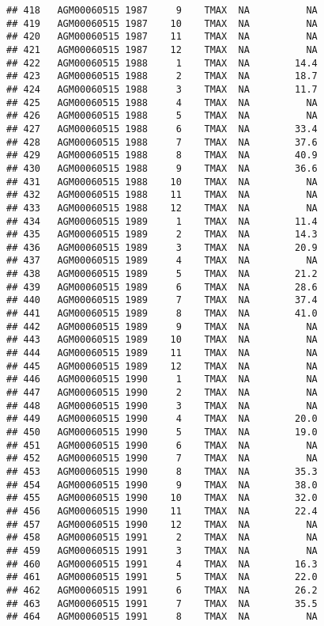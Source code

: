 \documentclass{article}\usepackage[]{graphicx}\usepackage[]{color}
\makeatletter
\newenvironment{kframe}{%
 \def\at@end@of@kframe{}%
 \ifinner\ifhmode%
  \def\at@end@of@kframe{\end{minipage}}%
  \begin{minipage}{\columnwidth}%
 \fi\fi%
 \def\FrameCommand##1{\hskip\@totalleftmargin \hskip-\fboxsep
 \colorbox{shadecolor}{##1}\hskip-\fboxsep
     \hskip-\linewidth \hskip-\@totalleftmargin \hskip\columnwidth}%
 \MakeFramed {\advance\hsize-\width
   \@totalleftmargin\z@ \linewidth\hsize
   \@setminipage}}%
 {\par\unskip\endMakeFramed%
 \at@end@of@kframe}
\newenvironment{knitrout}{}{} %
\makeatother
\begin{document}
\begin{knitrout}
\begin{kframe}
\begin{verbatim}
## 418   AGM00060515 1987     9    TMAX  NA          NA
## 419   AGM00060515 1987    10    TMAX  NA          NA
## 420   AGM00060515 1987    11    TMAX  NA          NA
## 421   AGM00060515 1987    12    TMAX  NA          NA
## 422   AGM00060515 1988     1    TMAX  NA        14.4
## 423   AGM00060515 1988     2    TMAX  NA        18.7
## 424   AGM00060515 1988     3    TMAX  NA        11.7
## 425   AGM00060515 1988     4    TMAX  NA          NA
## 426   AGM00060515 1988     5    TMAX  NA          NA
## 427   AGM00060515 1988     6    TMAX  NA        33.4
## 428   AGM00060515 1988     7    TMAX  NA        37.6
## 429   AGM00060515 1988     8    TMAX  NA        40.9
## 430   AGM00060515 1988     9    TMAX  NA        36.6
## 431   AGM00060515 1988    10    TMAX  NA          NA
## 432   AGM00060515 1988    11    TMAX  NA          NA
## 433   AGM00060515 1988    12    TMAX  NA          NA
## 434   AGM00060515 1989     1    TMAX  NA        11.4
## 435   AGM00060515 1989     2    TMAX  NA        14.3
## 436   AGM00060515 1989     3    TMAX  NA        20.9
## 437   AGM00060515 1989     4    TMAX  NA          NA
## 438   AGM00060515 1989     5    TMAX  NA        21.2
## 439   AGM00060515 1989     6    TMAX  NA        28.6
## 440   AGM00060515 1989     7    TMAX  NA        37.4
## 441   AGM00060515 1989     8    TMAX  NA        41.0
## 442   AGM00060515 1989     9    TMAX  NA          NA
## 443   AGM00060515 1989    10    TMAX  NA          NA
## 444   AGM00060515 1989    11    TMAX  NA          NA
## 445   AGM00060515 1989    12    TMAX  NA          NA
## 446   AGM00060515 1990     1    TMAX  NA          NA
## 447   AGM00060515 1990     2    TMAX  NA          NA
## 448   AGM00060515 1990     3    TMAX  NA          NA
## 449   AGM00060515 1990     4    TMAX  NA        20.0
## 450   AGM00060515 1990     5    TMAX  NA        19.0
## 451   AGM00060515 1990     6    TMAX  NA          NA
## 452   AGM00060515 1990     7    TMAX  NA          NA
## 453   AGM00060515 1990     8    TMAX  NA        35.3
## 454   AGM00060515 1990     9    TMAX  NA        38.0
## 455   AGM00060515 1990    10    TMAX  NA        32.0
## 456   AGM00060515 1990    11    TMAX  NA        22.4
## 457   AGM00060515 1990    12    TMAX  NA          NA
## 458   AGM00060515 1991     2    TMAX  NA          NA
## 459   AGM00060515 1991     3    TMAX  NA          NA
## 460   AGM00060515 1991     4    TMAX  NA        16.3
## 461   AGM00060515 1991     5    TMAX  NA        22.0
## 462   AGM00060515 1991     6    TMAX  NA        26.2
## 463   AGM00060515 1991     7    TMAX  NA        35.5
## 464   AGM00060515 1991     8    TMAX  NA          NA

\end{verbatim}
\end{kframe}
\end{knitrout}
\end{document}
